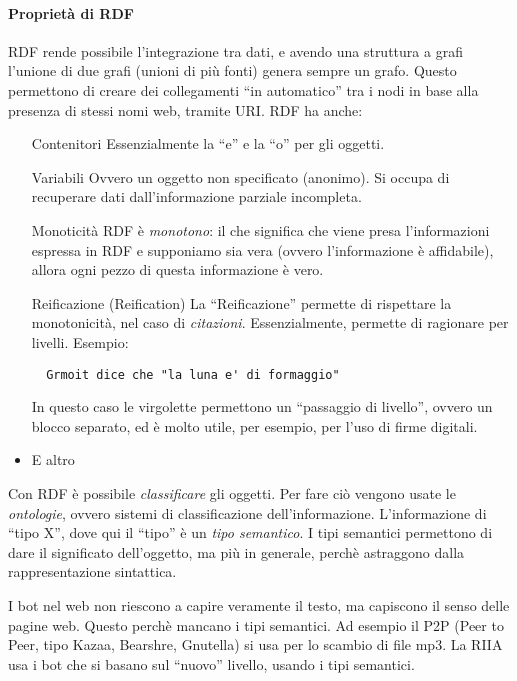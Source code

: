 \paragraph*{Propriet\`a di RDF}RDF rende possibile l'integrazione tra dati, e avendo una struttura a grafi l'unione di due grafi (unioni di pi\`u fonti) genera sempre un grafo. Questo permettono di creare dei collegamenti ``in automatico'' tra i nodi in base alla presenza di stessi nomi web, tramite URI.
RDF ha anche:
\begin{itemize}

\item[Contenitori] Essenzialmente la ``e'' e la ``o'' per gli oggetti.
\item[Variabili] Ovvero un oggetto non specificato (anonimo). Si occupa di recuperare dati dall'informazione parziale incompleta.
\item[Monoticit\`a] RDF \`e \textit{monotono}: il che significa che viene presa l'informazioni espressa in RDF e supponiamo sia vera (ovvero l'informazione \`e affidabile), allora ogni pezzo di questa informazione \`e vero.
\item[Reificazione] (Reification) La ``Reificazione'' permette di rispettare la monotonicit\`a, nel caso di \textit{citazioni}. Essenzialmente, permette di ragionare per livelli. Esempio:
\begin{verbatim}
  Grmoit dice che "la luna e' di formaggio"
\end{verbatim}
In questo caso le virgolette permettono un ``passaggio di livello'', ovvero un blocco separato, ed \`e molto utile, per esempio, per l'uso di firme digitali.

\item E altro %

\end{itemize}

Con RDF \`e possibile \textit{classificare} gli oggetti. Per fare ci\`o vengono usate le \textit{ontologie}, ovvero sistemi di classificazione dell'informazione. L'informazione di ``tipo X'', dove qui il ``tipo'' \`e un \textit{tipo semantico}. I tipi semantici permettono di dare il significato dell'oggetto, ma pi\`u in generale, perch\`e astraggono dalla rappresentazione sintattica.

I bot nel web non riescono a capire veramente il testo, ma capiscono il senso delle pagine web. Questo perch\`e mancano i tipi semantici. Ad esempio il P2P (Peer to Peer, tipo Kazaa, Bearshre, Gnutella) si usa per lo scambio di file mp3. La RIIA usa i bot che si basano sul ``nuovo'' livello, usando i tipi semantici.

